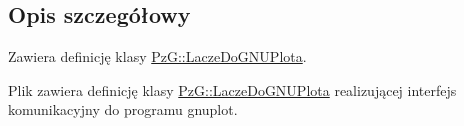 \subsection{Opis szczegółowy}
Zawiera definicję klasy \hyperlink{classPzG_1_1LaczeDoGNUPlota}{Pz\+G\+::\+Lacze\+Do\+G\+N\+U\+Plota}. 

Plik zawiera definicję klasy \hyperlink{classPzG_1_1LaczeDoGNUPlota}{Pz\+G\+::\+Lacze\+Do\+G\+N\+U\+Plota} realizującej interfejs komunikacyjny do programu gnuplot. 